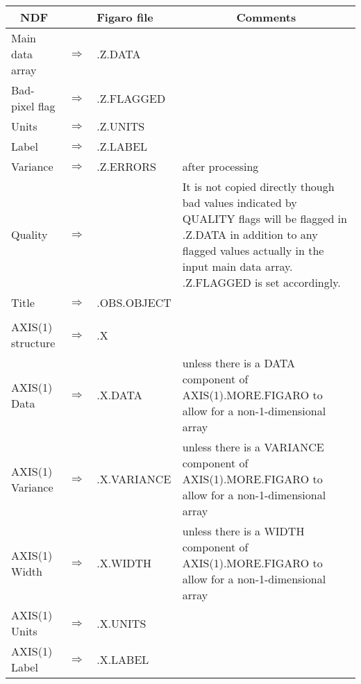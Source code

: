 {{      \begin{center}
      \begin{tabular}{|lcl|p{56mm}|}
      \hline 
      \multicolumn{1}{|c}{NDF} & & Figaro file &
      \multicolumn{1}{|c|}{Comments} \\ \hline
      Main data array  & $\Rightarrow$ & .Z.DATA & \\
      Bad-pixel flag   & $\Rightarrow$ & .Z.FLAGGED & \\
      Units            & $\Rightarrow$ & .Z.UNITS & \\
      Label            & $\Rightarrow$ & .Z.LABEL & \\
      Variance         & $\Rightarrow$ & .Z.ERRORS & after processing \\
      Quality          & $\Rightarrow$ &  & It is not copied directly
                         though bad values indicated by QUALITY flags will
                         be flagged in .Z.DATA in addition to any flagged
                         values actually in the input main data array.
                         .Z.FLAGGED is set accordingly. \\
      Title            & $\Rightarrow$ & .OBS.OBJECT & \\
      & & & \\
      AXIS(1) structure & $\Rightarrow$ & .X & \\
      AXIS(1) Data  & $\Rightarrow$ & .X.DATA & unless there is a DATA
                          component of AXIS(1).MORE.FIGARO to allow for a 
                          non-1-dimensional array \\
      AXIS(1) Variance & $\Rightarrow$ & .X.VARIANCE & unless there is a
                          VARIANCE component of AXIS(1).MORE.FIGARO to
                          allow for a non-1-dimensional array \\
      AXIS(1) Width & $\Rightarrow$ & .X.WIDTH & unless there is a WIDTH
                          component of AXIS(1).MORE.FIGARO to
                          allow for a non-1-dimensional array \\
      AXIS(1) Units & $\Rightarrow$ & .X.UNITS & \\
      AXIS(1) Label & $\Rightarrow$ & .X.LABEL & \\ \hline
      \end{tabular}
      \end{center}

}}
